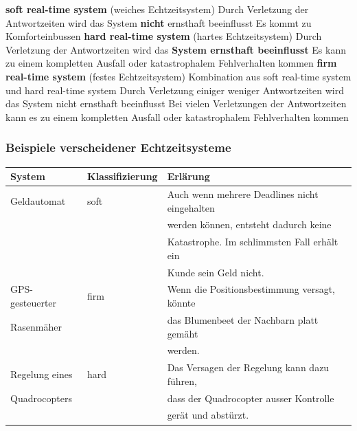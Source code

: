 \begin{outline}
    \1 \textbf{soft real-time system} (weiches Echtzeitsystem)
        \2 Durch Verletzung der Antwortzeiten wird das System \textbf{nicht} ernsthaft beeinflusst
        \2 Es kommt zu Komforteinbussen
    \1 \textbf{hard real-time system} (hartes Echtzeitsystem)
        \2 Durch Verletzung der Antwortzeiten wird das \textbf{System ernsthaft beeinflusst}
        \2 Es kann zu einem kompletten Ausfall oder katastrophalem Fehlverhalten kommen
    \1 \textbf{firm real-time system} (festes Echtzeitsystem)
        \2 Kombination aus soft real-time system und hard real-time system
        \2 Durch Verletzung einiger weniger Antwortzeiten wird das System nicht ernsthaft beeinflusst
        \2 Bei vielen Verletzungen der Antwortzeiten kann es zu einem kompletten Ausfall oder katastrophalem Fehlverhalten kommen
\end{outline}


\subsubsection{Beispiele verscheidener Echtzeitsysteme}

\begin{center}
    \begin{tabular}{@{}lll@{}}
        \toprule
        \textbf{System}     & \textbf{Klassifizierung}  & \textbf{Erlärung}                             \\
        \midrule
        Geldautomat         & soft                      & Auch wenn mehrere Deadlines nicht eingehalten \\
                            &                           & werden können, entsteht dadurch keine         \\
                            &                           & Katastrophe. Im schlimmsten Fall erhält ein   \\
                            &                           & Kunde sein Geld nicht.                        \\
        \midrule
        GPS-gesteuerter     & firm                      & Wenn die Positionsbestimmung versagt, könnte  \\
        Rasenmäher          &                           & das Blumenbeet der Nachbarn platt gemäht      \\
                            &                           & werden.                                       \\
        \midrule
        Regelung eines      & hard                      & Das Versagen der Regelung kann dazu führen,   \\
        Quadrocopters       &                           & dass der Quadrocopter ausser Kontrolle        \\
                            &                           & gerät und abstürzt.                           \\
        \bottomrule
    \end{tabular}
\end{center}


